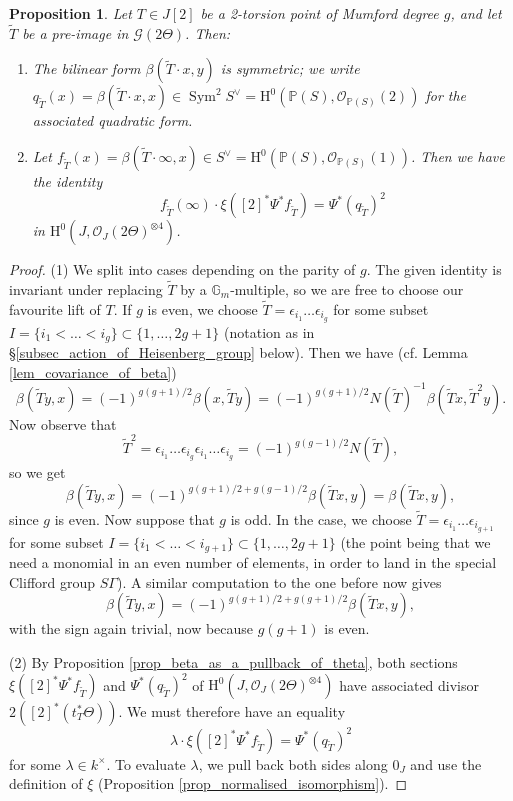\documentclass{article} %
\newtheorem{proposition}{Proposition}[section]
\numberwithin{equation}{section}
\newcommand{\G}{\mathbb{G}}
\DeclareMathOperator{\Sym}{Sym}
\renewcommand{\P}{\mathbb{P}}
\renewcommand{\O}{\mathcal{O}}
\newcommand{\HH}{\mathrm{H}}
\newcommand{\cO}{\mathcal{O}}
\begin{document}
\begin{proposition}\label{prop_Riemann_theta_relation_as_incidence_relation}
    Let $T \in J[2]$ be a 2-torsion point of Mumford degree $g$, and let ${\widetilde{T}}$ be a pre-image in $\mathcal{G}(2 \Theta)$. Then:
    \begin{enumerate}
        \item The bilinear form $\beta( \widetilde{T} \cdot x, y)$ is symmetric; we write $q_{\widetilde{T}}(x) = \beta( \widetilde{T} \cdot x,x) \in \Sym^2 S^\vee =\HH^0(\P(S), \cO_{\P(S)}(2))$ for the associated quadratic form.
        \item Let $f_{\widetilde{T}}(x) = \beta(\widetilde{T} \cdot \infty,x) \in S^\vee =\HH^0(
        \P(S), \cO_{\P(S)}(1))$. Then we have the identity
        \[ f_{\widetilde{T}}(\infty) \cdot \xi([2]^\ast \Psi^\ast f_{\widetilde{T}}) = \Psi^\ast(q_{\widetilde{T}})^2 \]
        in $\HH^0(J, \cO_J(2 \Theta)^{\otimes 4})$.
    \end{enumerate}
\end{proposition}
\begin{proof}
    (1) We split into cases depending on the parity of $g$. The given identity is invariant under replacing $\widetilde{T}$ by a $\G_m$-multiple, so we are free to choose our favourite lift of $T$. If $g$ is even, we choose $\widetilde{T} = \epsilon_{i_1} \dots \epsilon_{i_g}$ for some subset $I = \{ i_1 < \dots < i_g \} \subset \{ 1, \dots, 2g+1 \}$ (notation as in \S \ref{subsec_action_of_Heisenberg_group} below). Then we have (cf. Lemma \ref{lem_covariance_of_beta})
    \[ \beta(\widetilde{T} y,x) = (-1)^{g(g+1)/2} \beta(x,\widetilde{T} y) = (-1)^{g(g+1)/2} N(\widetilde{T})^{-1} \beta(\widetilde{T} x,\widetilde{T}^2 y ). \]
    Now observe that
    \[ \widetilde{T}^2 = \epsilon_{i_1} \dots \epsilon_{i_g} \epsilon_{i_1} \dots \epsilon_{i_g} = (-1)^{g(g-1)/2} N(\widetilde{T}), \]
    so we get
    \[ \beta(\widetilde{T} y,x) = (-1)^{g(g+1)/2 + g(g-1)/2} \beta(\widetilde{T} x,y) = \beta( \widetilde{T} x,y), \]
    since $g$ is even. Now suppose that $g$ is odd. In the case, we choose $\widetilde{T} = \epsilon_{i_1} \dots \epsilon_{i_{g+1}}$ for some subset $I = \{ i_1 < \dots < i_{g+1} \} \subset \{ 1, \dots, 2g+1 \}$ (the point being that we need a monomial in an even number of elements, in order to land in the special Clifford group $S \Gamma$). A similar computation to the one before now gives
    \[ \beta(\widetilde{T} y,x) = (-1)^{g(g+1)/2 + g(g+1)/2} \beta(\widetilde{T} x,y), \]
    with the sign again trivial, now because $g(g+1)$ is even. 
    
    (2)  By Proposition \ref{prop_beta_as_a_pullback_of_theta}, both sections $\xi([2]^\ast \Psi^\ast f_{\widetilde{T}})$ and $\Psi^\ast(q_{\widetilde{T}})^2$ of $\HH^0(J, \O_J(2 \Theta)^{\otimes 4})$ have associated divisor $2( [2]^{\ast}(t_T^\ast\Theta) )$. We must therefore have an equality
    \[ \lambda \cdot \xi([2]^\ast \Psi^\ast f_{\widetilde{T}}) = \Psi^\ast(q_{\widetilde{T}})^2 \]
    for some $\lambda \in k^\times$. To evaluate $\lambda$, we pull back both sides along $0_J$ and use the definition of $\xi$ (Proposition \ref{prop_normalised_isomorphism}).
\end{proof}
\end{document}
